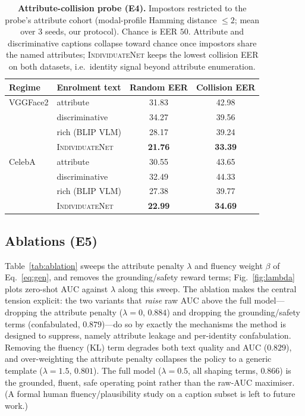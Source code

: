 \documentclass[10pt,twocolumn,letterpaper]{article}
\newcommand{\method}{\textsc{IndividuateNet}}
\begin{document}
\begin{table}[t]
  \centering\small
  \setlength{\tabcolsep}{5pt}
  \begin{tabular}{@{}llcc@{}}
    \toprule
    \textbf{Regime} & \textbf{Enrolment text} & \textbf{Random EER} & \textbf{Collision EER} \\
    \midrule
    VGGFace2 & attribute        & 31.83 & 42.98 \\
             & discriminative   & 34.27 & 39.56 \\
             & rich (BLIP VLM)  & 28.17 & 39.24 \\
             & \method{}        & \textbf{21.76} & \textbf{33.39} \\
    \midrule
    CelebA   & attribute        & 30.55 & 43.65 \\
             & discriminative   & 32.49 & 44.33 \\
             & rich (BLIP VLM)  & 27.38 & 39.77 \\
             & \method{}        & \textbf{22.99} & \textbf{34.69} \\
    \bottomrule
  \end{tabular}
  \caption{\textbf{Attribute-collision probe (E4).} Impostors restricted to the probe's
  attribute cohort (modal-profile Hamming distance $\le 2$; mean over 3 seeds, our protocol).
  Chance is EER $50$. Attribute and discriminative captions collapse toward chance once
  impostors share the named attributes; \method{} keeps the lowest collision EER on both
  datasets, i.e.\ identity signal beyond attribute enumeration.}
  \label{tab:collision}
\end{table}

\subsection{Ablations (E5)}
\label{sec:e5}
Table~\ref{tab:ablation} sweeps the attribute penalty $\lambda$ and fluency weight $\beta$ of
Eq.~\ref{eq:gen}, and removes the grounding/safety reward terms; Fig.~\ref{fig:lambda}
plots zero-shot AUC against $\lambda$ along this sweep. The ablation makes the central tension
explicit: the two variants that \emph{raise} raw AUC above the full model---dropping the
attribute penalty ($\lambda{=}0$, $0.884$) and dropping the grounding/safety terms
(confabulated, $0.879$)---do so by exactly the mechanisms the method is designed to suppress,
namely attribute leakage and per-identity confabulation. Removing the fluency (KL) term degrades
both text quality and AUC ($0.829$), and over-weighting the attribute penalty collapses the
policy to a generic template ($\lambda{=}1.5$, $0.801$). The full model ($\lambda{=}0.5$, all
shaping terms, $0.866$) is the grounded, fluent, safe operating point rather than the raw-AUC
maximiser. (A formal human fluency/plausibility study on a caption subset is left to future work.)
\end{document}
